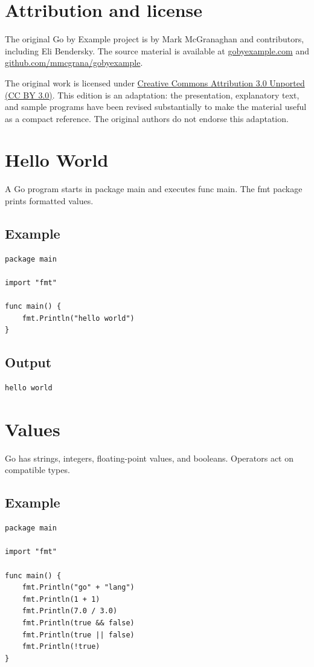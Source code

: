 \documentclass[10pt,oneside]{article}
\newcommand{\sectionline}{\par\vspace{4pt}{\color{rule}\hrule height .5pt}\vspace{7pt}\color{ink}\noindent}
\begin{document}
\section*{Attribution and license}
The original Go by Example project is by Mark McGranaghan and contributors, including Eli Bendersky. The source material is available at \href{https://gobyexample.com}{gobyexample.com} and \href{https://github.com/mmcgrana/gobyexample}{github.com/mmcgrana/gobyexample}.

The original work is licensed under \href{https://creativecommons.org/licenses/by/3.0/}{Creative Commons Attribution 3.0 Unported (CC BY 3.0)}. This edition is an adaptation: the presentation, explanatory text, and sample programs have been revised substantially to make the material useful as a compact reference. The original authors do not endorse this adaptation.
\clearpage
{}
\clearpage
\section{Hello World}
\sectionline
A Go program starts in package main and executes func main. The fmt package prints formatted values.\par
\subsection*{Example}
\begin{lstlisting}[style=gocode]
package main

import "fmt"

func main() {
	fmt.Println("hello world")
}
\end{lstlisting}
\subsection*{Output}
\begin{lstlisting}[style=terminal]
hello world
\end{lstlisting}
\clearpage
\section{Values}
\sectionline
Go has strings, integers, floating-point values, and booleans. Operators act on compatible types.\par
\subsection*{Example}
\begin{lstlisting}[style=gocode]
package main

import "fmt"

func main() {
	fmt.Println("go" + "lang")
	fmt.Println(1 + 1)
	fmt.Println(7.0 / 3.0)
	fmt.Println(true && false)
	fmt.Println(true || false)
	fmt.Println(!true)
}
\end{lstlisting}
\end{document}
